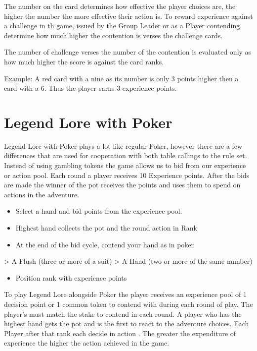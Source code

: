 \documentclass{article}
\begin{document}
The number on the card determines how effective the player choices are, the higher the number the more effective their action is. To reward experience against a challenge in th game, issued by the Group  Leader or as a Player contending, determine how much higher the contention is verses the challenge cards.

The number of challenge verses the number of the contention is evaluated only as how much higher the score is against the card ranks.

Example: A red card with a nine as its number is only 3 points higher then a card with a 6. Thus the player earns 3 experience points.


\section{Legend Lore with Poker}

Legend Lore with Poker plays a lot like regular Poker, however there are a few differences that are used for cooperation with both table callings to the rule set. Instead of using gambling tokens the game allows us to bid from our experience or action pool. Each round a player receives 10 Experience points. After the bids are made the winner of the pot receives the points and uses them to spend on actions in the adventure.

\begin{itemize}
\item  Select a hand and bid points from the experience pool.
\item Highest hand collects the pot and the round action in Rank
\item At the end of the bid cycle, contend your hand as in poker
\end{itemize}

        > A Flush (three or more of a suit)
        > A Hand (two or more of the same number)
        
\begin{itemize}
\item  Position rank with experience points
\end{itemize}

	To play Legend Lore alongside Poker the player receives an experience pool of 1 decision point or 1 common token to contend with during each round of play. The player's must match the stake to contend in each round.  A player who has the highest hand gets the pot and is the first to react to the adventure choices. Each Player after that rank each decide in action . The greater the expenditure of experience the higher the action achieved in the game.
    
\end{document}
